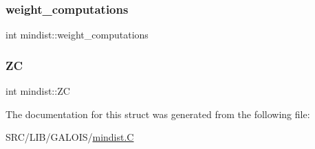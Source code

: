 \mbox{\label{structmindist_a52548870b6867c60c824ce15d09a1393}} 
\subsubsection{\texorpdfstring{weight\+\_\+computations}{weight\_computations}}
{\footnotesize\ttfamily int mindist\+::weight\+\_\+computations}

\mbox{\label{structmindist_a7864f64929fe652c51d4f3ab73d2ea5f}} 
\subsubsection{\texorpdfstring{ZC}{ZC}}
{\footnotesize\ttfamily int mindist\+::\+ZC}



The documentation for this struct was generated from the following file\+:\begin{DoxyCompactItemize}
\item 
S\+R\+C/\+L\+I\+B/\+G\+A\+L\+O\+I\+S/\mbox{\hyperlink{mindist_8_c}{mindist.\+C}}\end{DoxyCompactItemize}
